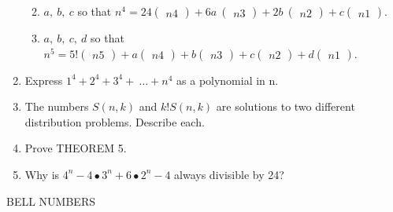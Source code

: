 \documentclass[10pt,letter]{article}
\begin{document}
\begin{enumerate}
\begin{enumerate}
  \def\labelenumii{\alph{enumii}.}

  \item
    \(a,\ b,\ c\) so that \(n^{4} = 24

\begin{pmatrix}
    n 
    4 
    \end{pmatrix}
 + 6a\

\begin{pmatrix}
    n 
    3 
    \end{pmatrix}
 + 2b\

\begin{pmatrix}
    n 
    2 
    \end{pmatrix}
 + c

\begin{pmatrix}
    n 
    1 
    \end{pmatrix}
\).
  \item
    \(a,\ b,\ c,\ d\) so that \(n^{5} = 5!

\begin{pmatrix}
    n 
    5 
    \end{pmatrix}
 + a

\begin{pmatrix}
    n 
    4 
    \end{pmatrix}
 + b

\begin{pmatrix}
    n 
    3 
    \end{pmatrix}
 + c

\begin{pmatrix}
    n 
    2 
    \end{pmatrix}
 + d

\begin{pmatrix}
    n 
    1 
    \end{pmatrix}
\).
  
\end{enumerate}
\item
  Express \(1^{4} + 2^{4} + 3^{4} + \ \ldots + n^{4}\) as a polynomial
  in n.
\item
  The numbers \(S(n,k)\) and \(k!S(n,k)\) are solutions to two different
  distribution problems. Describe each.
\item
  Prove THEOREM 5.
\item
  Why is \(4^{n} - 4 \bullet 3^{n} + 6 \bullet 2^{n} - 4\) always
  divisible by 24?

\end{enumerate}

BELL NUMBERS
\end{document}
